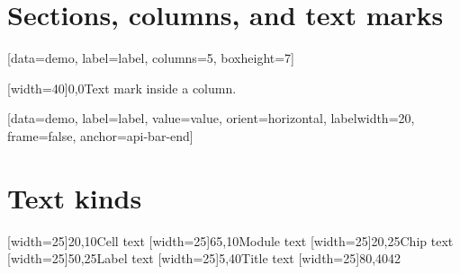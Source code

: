 \documentclass[type=report,theme=light,language=de]{semio}
\begin{document}
\section{Sections, columns, and text marks}
\begin{VizFigure}[title={Section, column, text}, width=100]
\begin{VizSection}[title={A \ Section title}]
[data=demo, label=label, columns=5, boxheight=7]
\end{VizSection}
\begin{VizSection}[title={B \ Two columns}]
\begin{VizColumn}[width=48, title={Left}]
[width=40]{0,0}{Text mark inside a column.}
\end{VizColumn}
\begin{VizColumn}[width=48, title={Right}, note={Caption text before the chart.}]
[data=demo, label=label, value=value, orient=horizontal, labelwidth=20, frame=false, anchor=api-bar-end]
\end{VizColumn}
\end{VizSection}
\end{VizFigure}
\section{Text kinds}
\begin{VizFigure}[title={Every text kind}, width=100, height=50]
[width=25]{20,10}{Cell text}
[width=25]{65,10}{Module text}
[width=25]{20,25}{Chip text}
[width=25]{50,25}{Label text}
[width=25]{5,40}{Title text}
[width=25]{80,40}{42}
\end{VizFigure}
\end{document}
